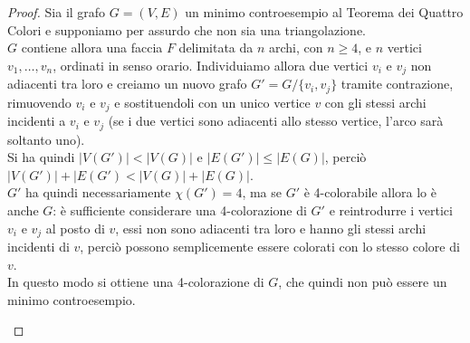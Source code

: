 \documentclass[a4paper,12pt,titlepage]{report}
\begin{document}
    \begin{proof}
    	Sia il grafo $G = (V, E)$ un minimo controesempio al Teorema dei Quattro Colori e supponiamo per assurdo che non sia una triangolazione. 
    	\\$G$ contiene allora una faccia $F$ delimitata da $n$ archi, con $n \geq 4$, e $n$ vertici $v_1, \dots, v_n$, ordinati in senso orario.
    	Individuiamo allora due vertici $v_i$ e $v_j$ non adiacenti tra loro e creiamo un nuovo grafo $G' = G/\{v_i, v_j\}$ tramite contrazione, rimuovendo $v_i$ e $v_j$ e sostituendoli con un unico vertice $v$ con gli stessi archi incidenti a $v_i$ e $v_j$ (se i due vertici sono adiacenti allo stesso vertice, l'arco sarà soltanto uno).
    	    \\Si ha quindi $\lvert V(G') \rvert < \lvert V(G) \rvert$ e $\lvert E(G') \rvert \leq \lvert E(G) \rvert$, perciò $\lvert V(G') \rvert + \lvert E(G') <  \lvert V(G) \rvert + \lvert E(G) \rvert$.
    		\\$G'$ ha quindi necessariamente $\chi(G') = 4$, ma se $G'$ è 4-colorabile allora lo è anche $G$: è sufficiente considerare una 4-colorazione di $G'$ e reintrodurre i vertici $v_i$ e $v_j$ al posto di $v$, essi non sono adiacenti tra loro e hanno gli stessi archi incidenti di $v$, perciò possono semplicemente essere colorati con lo stesso colore di $v$.
    		\\In questo modo si ottiene una 4-colorazione di $G$, che quindi non può essere un minimo controesempio.
    		\begin{figure}[H]
    			\centering
\end{figure}
\end{proof}
\end{document}
